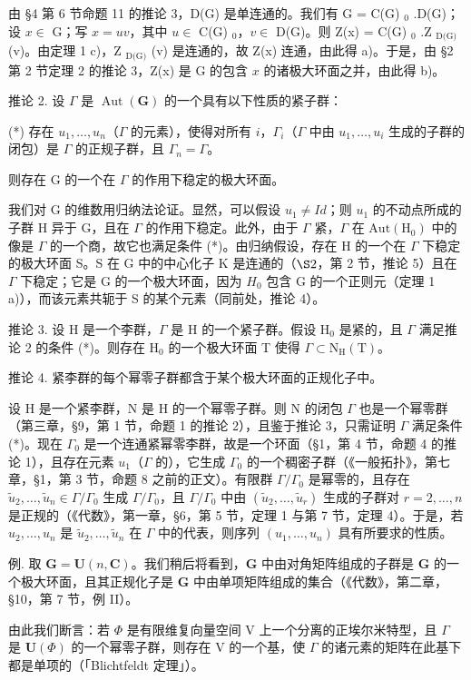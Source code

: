 由 §4 第 6 节命题 11 的推论 3，D(G) 是单连通的。我们有 G = C(G) \(_0\) .D(G)；设 \(x \in\) G；写 \(x = uv\)，其中 \(u \in\) C(G) \(_0\)，\(v \in\) D(G)。则 Z(x) = C(G) \(_0\) .Z \(_{\text{D(G)}}\) (v)。由定理 1 c)，Z \(_{\text{D(G)}}\) (v) 是连通的，故 Z(x) 连通，由此得 a)。于是，由 §2 第 2 节定理 2 的推论 3，Z(x) 是 G 的包含 \(x\) 的诸极大环面之并，由此得 b)。

推论 2. 设 \(\Gamma\) 是 \(\operatorname{Aut}(\mathbf{G})\) 的一个具有以下性质的紧子群：

(*) 存在 \(u_{1}, \ldots, u_{n}\)（\(\Gamma\) 的元素），使得对所有 \(i\)，\(\Gamma_{i}\)（\(\Gamma\) 中由 \(u_{1}, \ldots, u_{i}\) 生成的子群的闭包）是 \(\Gamma\) 的正规子群，且 \(\Gamma_{n} = \Gamma\)。

则存在 G 的一个在 \(\Gamma\) 的作用下稳定的极大环面。

我们对 G 的维数用归纳法论证。显然，可以假设 \(u_{1} \neq Id\)；则 \(u_{1}\) 的不动点所成的子群 H 异于 G，且在 \(\varGamma\) 的作用下稳定。此外，由于 \(\varGamma\) 紧，\(\varGamma\) 在 \(\mathrm{Aut}(\mathrm{H}_{0})\) 中的像是 \(\varGamma\) 的一个商，故它也满足条件 (*)。由归纳假设，存在 H 的一个在 \(\varGamma\) 下稳定的极大环面 S。S 在 G 中的中心化子 K 是连通的（\(\S2\)，第 2 节，推论 5）且在 \(\varGamma\) 下稳定；它是 G 的一个极大环面，因为 \(H_{0}\) 包含 G 的一个正则元（定理 1 a)），而该元素共轭于 S 的某个元素（同前处，推论 4）。

推论 3. 设 H 是一个李群，\(\Gamma\) 是 H 的一个紧子群。假设 \(\mathrm{H}_0\) 是紧的，且 \(\Gamma\) 满足推论 2 的条件 (*)。则存在 \(\mathrm{H}_0\) 的一个极大环面 T 使得 \(\Gamma \subset \mathrm{N}_{\mathrm{H}}(\mathrm{T})\)。

推论 4. 紧李群的每个幂零子群都含于某个极大环面的正规化子中。

设 H 是一个紧李群，N 是 H 的一个幂零子群。则 N 的闭包 \(\varGamma\) 也是一个幂零群（第三章，§9，第 1 节，命题 1 的推论 2），且鉴于推论 3，只需证明 \(\varGamma\) 满足条件 (*)。现在 \(\varGamma_{0}\) 是一个连通紧幂零李群，故是一个环面（§1，第 4 节，命题 4 的推论 1），且存在元素 \(u_{1}\)（\(\varGamma\) 的），它生成 \(\varGamma_{0}\) 的一个稠密子群（《一般拓扑》，第七章，§1，第 3 节，命题 8 之前的正文）。有限群 \(\varGamma/\varGamma_{0}\) 是幂零的，且存在 \(\tilde{u}_{2},\ldots,\tilde{u}_{n}\in\varGamma/\varGamma_{0}\) 生成 \(\varGamma/\varGamma_{0}\)，且 \(\varGamma/\varGamma_{0}\) 中由 \((\tilde{u}_{2},\ldots,\tilde{u}_{r})\) 生成的子群对 \(r=2,\ldots,n\) 是正规的（《代数》，第一章，§6，第 5 节，定理 1 与第 7 节，定理 4）。于是，若 \(u_{2},\ldots,u_{n}\) 是 \(\tilde{u}_{2},\ldots,\tilde{u}_{n}\) 在 \(\varGamma\) 中的代表，则序列 \((u_{1},\ldots,u_{n})\) 具有所要求的性质。

例. 取 \(\mathbf{G} = \mathbf{U}(n,\mathbf{C})\)。我们稍后将看到，\(\mathbf{G}\) 中由对角矩阵组成的子群是 \(\mathbf{G}\) 的一个极大环面，且其正规化子是 \(\mathbf{G}\) 中由单项矩阵组成的集合（《代数》，第二章，§10，第 7 节，例 II）。

由此我们断言：若 \(\Phi\) 是有限维复向量空间 V 上一个分离的正埃尔米特型，且 \(\Gamma\) 是 \(\mathbf{U}(\Phi)\) 的一个幂零子群，则存在 V 的一个基，使 \(\Gamma\) 的诸元素的矩阵在此基下都是单项的（「Blichtfeldt 定理」）。

